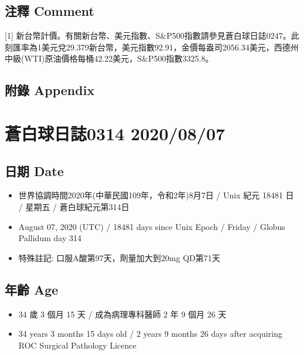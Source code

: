 \documentclass[a5paper, 11pt
]{book}
\providecommand{\tightlist}{%
  \setlength{\itemsep}{0pt}\setlength{\parskip}{0pt}}
\begin{document}
\hypertarget{ux6ce8ux91cb-comment-66}{%
\subsection{注釋 Comment}\label{ux6ce8ux91cb-comment-66}}

{[}1{]}
新台幣計價。有關新台幣、美元指數、S\&P500指數請參見蒼白球日誌0247。此刻匯率為1美元兌29.379新台幣，美元指數92.91，金價每盎司2056.34美元，西德州中級(WTI)原油價格每桶42.22美元，S\&P500指數3325.8。

\hypertarget{ux9644ux9304-appendix-66}{%
\subsection{附錄 Appendix}\label{ux9644ux9304-appendix-66}}

\hypertarget{ux84bcux767dux7403ux65e5ux8a8c0314-20200807}{%
\section{蒼白球日誌0314
2020/08/07}\label{ux84bcux767dux7403ux65e5ux8a8c0314-20200807}}

\hypertarget{ux65e5ux671f-date-67}{%
\subsection{日期 Date}\label{ux65e5ux671f-date-67}}

\begin{itemize}
\tightlist
\item
  世界協調時間2020年(中華民國109年，令和2年)8月7日 / Unix 紀元 18481 日
  / 星期五 / 蒼白球紀元第314日
\item
  August 07, 2020 (UTC) / 18481 days since Unix Epoch / Friday / Globus
  Pallidum day 314
\item
  特殊註記: 口服A酸第97天，劑量加大到20mg QD第71天
\end{itemize}

\hypertarget{ux5e74ux9f61-age-67}{%
\subsection{年齡 Age}\label{ux5e74ux9f61-age-67}}

\begin{itemize}
\tightlist
\item
  34 歲 3 個月 15 天 / 成為病理專科醫師 2 年 9 個月 26 天
\item
  34 years 3 months 15 days old / 2 years 9 months 26 days after
  acquiring ROC Surgical Pathology Licence
\end{itemize}
\end{document}
